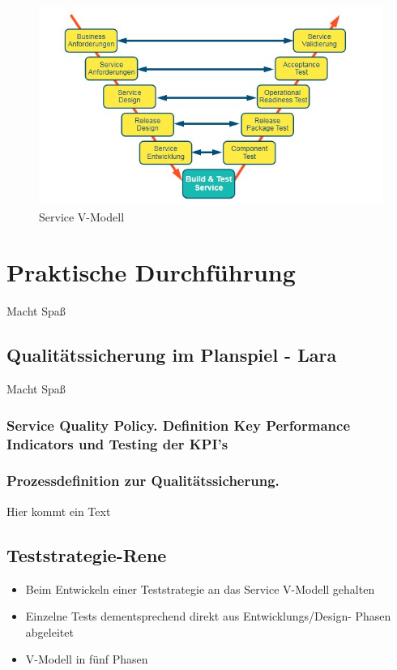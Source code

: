 \documentclass[sigconf]{acmart}
\begin{document}
\begin{figure}[th]
\includegraphics[width=\columnwidth]{V-Modell.jpg}
\caption{Service V-Modell \cite{Beims.2015} }
\label{fig:vmodell}
\end{figure}

\section{Praktische Durchführung}
Macht Spaß

\subsection{Qualitätssicherung im Planspiel - Lara}
Macht Spaß

\subsubsection{Service Quality Policy. Definition Key Performance Indicators und Testing der KPI’s}

\subsubsection{Prozessdefinition zur Qualitätssicherung.}
Hier kommt ein Text

\subsection{Teststrategie-Rene}
\begin{itemize}
\item Beim Entwickeln einer Teststrategie an das Service V-Modell gehalten
\item Einzelne Tests dementsprechend direkt aus Entwicklungs/Design- Phasen abgeleitet
\item V-Modell in fünf Phasen
\end{itemize}
\end{document}
